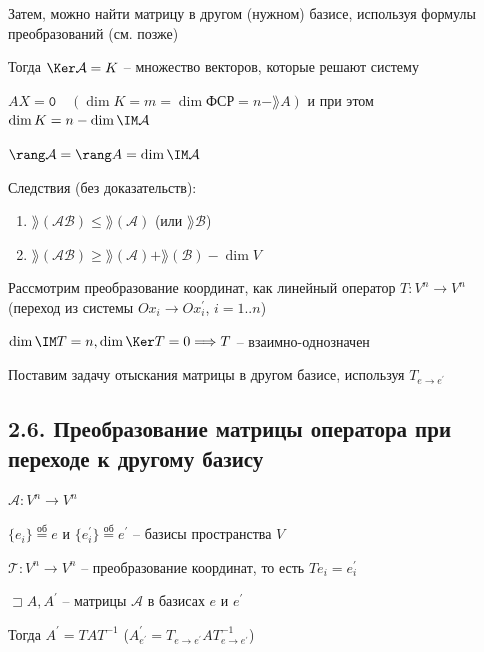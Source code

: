 \documentclass[12pt]{article}
\begin{document}
    Затем, можно найти матрицу в другом (нужном) базисе, используя формулы преобразований (см. \Ths позже)

    Тогда $\Ker \mathcal{A} = K$ -- множество векторов, которые решают систему

    $AX = \texttt{0} \quad (\dim K = m = \dim \text{ФСР} = n - \rang A)$ и при этом $\dim K = n - \dim \IM \mathcal{A}$

    $\rang \mathcal{A} = \rang A = \dim \IM \mathcal{A}$

    Следствия (без доказательств):

    \begin{enumerate}
        \item $\rang(\mathcal{AB}) \leq \rang(\mathcal{A})$ (или $\rang \mathcal{B}$)

        \item $\rang(\mathcal{AB}) \geq \rang(\mathcal{A}) + \rang(\mathcal{B}) - \dim V$
    \end{enumerate}

    \Nota Рассмотрим преобразование координат, как линейный оператор $T : V^n \rightarrow V^n$ (переход из системы $Ox_i \rightarrow Ox_i^\prime$, $i = 1..n$)

    $\dim \IM T = n, \dim \Ker T = 0 \Longrightarrow T$ -- взаимно-однозначен

    Поставим задачу отыскания матрицы в другом базисе, используя $T_{e \to e^\prime}$

    \subsection[p2\_6]{2.6. Преобразование матрицы оператора при переходе к другому базису}

    \hypertarget{transformationtodifferentbasis}{}

    \begin{MyTheorem}
        \Ths $\mathcal{A} : V^n \rightarrow V^n$

        $\{e_i\} \stackrel{\text{об}}{=} e$ и $\{e^\prime_i\} \stackrel{\text{об}}{=} e^\prime$ -- базисы пространства $V$

        $\mathcal{T} : V^n \rightarrow V^n$ -- преобразование координат, то есть $Te_i = e^\prime_i$

        $\sqsupset A, A^\prime$ -- матрицы $\mathcal{A}$ в базисах $e$ и $e^\prime$

        Тогда $A^\prime = TAT^{-1}$ ($A^\prime_{e^\prime} = T_{e\to e^\prime}AT^{-1}_{e\to e^\prime}$)
    \end{MyTheorem}
\end{document}
